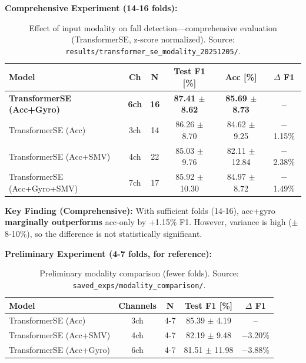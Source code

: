 \documentclass{article}
\begin{document}
\textbf{Comprehensive Experiment (14-16 folds):}

\begin{table}[htbp]
    \centering
    \caption{Effect of input modality on fall detection---comprehensive evaluation (TransformerSE, z-score normalized). Source: \texttt{results/transformer\_se\_modality\_20251205/}.}
    \label{tab:rq2_comprehensive}
    \begin{tabular}{lccccc}
        \toprule
        \textbf{Model} & \textbf{Ch} & \textbf{N} & \textbf{Test F1 [\%]} & \textbf{Acc [\%]} & \textbf{$\Delta$ F1} \\
        \midrule
        \textbf{TransformerSE (Acc+Gyro)} & \textbf{6ch} & \textbf{16} & \textbf{87.41 $\pm$ 8.62} & \textbf{85.69 $\pm$ 8.73} & \textbf{--} \\
        TransformerSE (Acc) & 3ch & 14 & 86.26 $\pm$ 8.70 & 84.62 $\pm$ 9.25 & $-$1.15\% \\
        TransformerSE (Acc+SMV) & 4ch & 22 & 85.03 $\pm$ 9.76 & 82.11 $\pm$ 12.84 & $-$2.38\% \\
        TransformerSE (Acc+Gyro+SMV) & 7ch & 17 & 85.92 $\pm$ 10.30 & 84.97 $\pm$ 8.72 & $-$1.49\% \\
        \bottomrule
    \end{tabular}
\end{table}

\textbf{Key Finding (Comprehensive):} With sufficient folds (14-16), acc+gyro \textbf{marginally outperforms} acc-only by +1.15\% F1. However, variance is high ($\pm$8-10\%), so the difference is not statistically significant.

\vspace{0.5em}
\textbf{Preliminary Experiment (4-7 folds, for reference):}

\begin{table}[htbp]
    \centering
    \caption{Preliminary modality comparison (fewer folds). Source: \texttt{saved\_exps/modality\_comparison/}.}
    \label{tab:rq2_preliminary}
    \begin{tabular}{lcccc}
        \toprule
        \textbf{Model} & \textbf{Channels} & \textbf{N} & \textbf{Test F1 [\%]} & \textbf{$\Delta$ F1} \\
        \midrule
        TransformerSE (Acc) & 3ch & 4-7 & 85.39 $\pm$ 4.19 & -- \\
        TransformerSE (Acc+SMV) & 4ch & 4-7 & 82.19 $\pm$ 9.48 & $-$3.20\% \\
        TransformerSE (Acc+Gyro) & 6ch & 4-7 & 81.51 $\pm$ 11.98 & $-$3.88\% \\
        \bottomrule
    \end{tabular}
\end{table}
\end{document}
